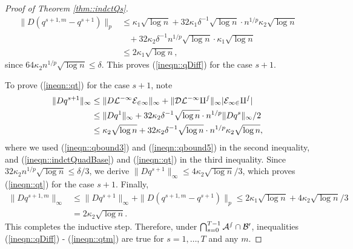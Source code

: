 \documentclass[12pt]{article}%
\theoremstyle{plain}%
\theoremstyle{remark}
\begin{document}
\begin{proof}[Proof of Theorem \ref{thm::indctQs}]
\begin{align*}
\| D(q^{s+1,m} - q^{s+1}) \|_p &\le \kappa_1 \sqrt{\log n} + 32\kappa_1\delta^{-1} \sqrt{\log n}\cdot n^{1/p}\kappa_2\sqrt{ \log n} \\
& ~~~~ +32\kappa_2\delta^{-1} n^{1/p}\sqrt{\log n} \cdot \kappa_1 \sqrt{ \log n} \\
& \le 2\kappa_1 \sqrt{\log n},
\end{align*}
since $64\kappa_2n^{1/p} \sqrt{\log n} \le \delta$. This proves (\ref{ineqn::qDiff}) for the case $s+1$. 

To prove (\ref{ineqn::qt}) for the case $s+1$, note
\begin{align*}
\| Dq^{s+1} \|_\infty &\le \| D \cal{L}^{-1} E_{21} \|_{\infty} + \| \cal{D} \cal{L}^{-1} q^s \|_{\infty} | E_{12} q^s |  \\
&\le  \| D q^1 \|_{\infty} + 32\kappa_2\delta^{-1} \sqrt{\log n} \cdot n^{1/p} \| Dq^s\|_{\infty}/2 \\
&\le \kappa_2  \sqrt{\log n} + 32\kappa_2\delta^{-1} \sqrt{\log n} \cdot n^{1/p} \kappa_2 \sqrt{\log n},
\end{align*}
where we used (\ref{ineqn::qbound3}) and (\ref{ineqn::qbound5}) in the second inequality, and (\ref{ineqn::indctQuadBase}) and (\ref{ineqn::qt}) in the third inequality. Since $32\kappa_2n^{1/p} \sqrt{\log n} \le \delta/3$, we derive $\| Dq^{s+1} \|_\infty \le 4\kappa_2\sqrt{\log n}/3$, which proves (\ref{ineqn::qt}) for the case $s+1$. Finally, 
\begin{align*}
\| Dq^{s+1,m} \|_\infty &\le \| Dq^{s+1} \|_\infty  + \| D(q^{s+1,m} - q^{s+1}) \|_p \le 2\kappa_1 \sqrt{\log n} + 4\kappa_2 \sqrt{\log n}/3 \\
&= 2\kappa_2 \sqrt{\log n}.
\end{align*}
This completes the inductive step. Therefore, under $\bigcap_{s=0}^{T-1}\cal{A}^s \cap \cal{B}^0$, inequalities (\ref{ineqn::qDiff}) - (\ref{ineqn::qtm}) are true for $s = 1,\ldots, T$ and any $m$.


\end{proof}
\end{document}
